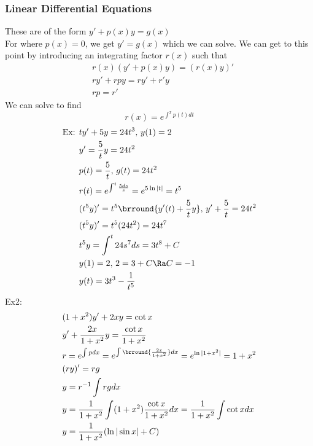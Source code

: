 \subsubsection{Linear Differential Equations}
These are of the form $y'+p(x)y=g(x)$\\
For where $p(x)=0$, we get $y'=g(x)$ which we can solve. We can get to this point by introducing an integrating factor $r(x)$ such that
\begin{align*}
    &r(x)(y'+p(x)y)=(r(x)y)'\\
    &ry'+rpy=ry'+r'y\\
    &rp=r'
\end{align*}
We can solve to find
$$r(x)=e^{\int^xp(t)dt}$$
\begin{align*}
    \text{Ex: }&ty'+5y=24t^3,\,y(1)=2\\
    &y'=\frac{5}{t}y=24t^2\\
    &p(t)=\frac{5}{t},\,g(t)=24t^2\\
    &r(t)=e^{\int^t\frac{5ds}{s}}=e^{5\ln|t|}=t^5\\
    &(t^5y)'=t^5\brround{y'(t)+\frac{5}{t}y},\,y'+\frac{5}{t}=24t^2\\
    &(t^5y)'=t^5(24t^2)=24t^7\\
    &t^5y=\int^t24s^7ds=3t^8+C\\
    &y(1)=2,\,2=3+C\Ra C=-1\\
    &y(t)=3t^3-\frac{1}{t^5}
\end{align*}
Ex2:
\begin{align*}
    &(1+x^2)y'+2xy=\cot x\\
    &y'+\frac{2x}{1+x^2}y=\frac{\cot x}{1+x^2}\\
    &r=e^{\int pdx}=e^{\int\brround{\frac{2x}{1+x^2}}dx}=e^{\ln|1+x^2|}=1+x^2\\
    &(ry)'=rg\\
    &y=r^{-1}\int rg dx\\
    &y=\frac{1}{1+x^2}\int(1+x^2)\frac{\cot x}{1+x^2}dx=\frac{1}{1+x^2}\int\cot x dx\\
    &y=\frac{1}{1+x^2}(\ln|\sin x|+C)
\end{align*}
